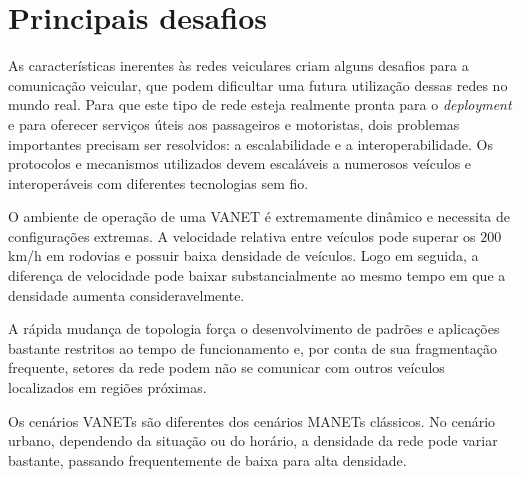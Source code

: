 \section{Principais desafios}
As características inerentes às redes veiculares criam alguns desafios para a
comunicação veicular, que podem dificultar uma futura utilização dessas redes no
mundo real. Para que este tipo de rede esteja realmente pronta para o
\textit{deployment} e para oferecer serviços úteis aos passageiros e
motoristas, dois problemas importantes precisam ser resolvidos: a
escalabilidade e a interoperabilidade. Os protocolos e mecanismos utilizados
devem escaláveis a numerosos veículos e interoperáveis com diferentes
tecnologias sem fio.

O ambiente de operação de uma VANET é extremamente dinâmico e necessita de
configurações extremas. A velocidade relativa entre veículos pode superar os
$200$ km/h em rodovias e possuir baixa densidade de veículos. Logo em seguida, a
diferença de velocidade pode baixar substancialmente ao mesmo tempo em que a
densidade aumenta consideravelmente.

A rápida mudança de topologia força o desenvolvimento de padrões e aplicações
bastante restritos ao tempo de funcionamento e, por conta de sua fragmentação
frequente, setores da rede podem não se comunicar com outros veículos
localizados em regiões próximas.

Os cenários VANETs são diferentes dos cenários MANETs clássicos. No cenário
urbano, dependendo da situação ou do horário, a densidade da rede pode variar
bastante, passando frequentemente de baixa para alta densidade.

